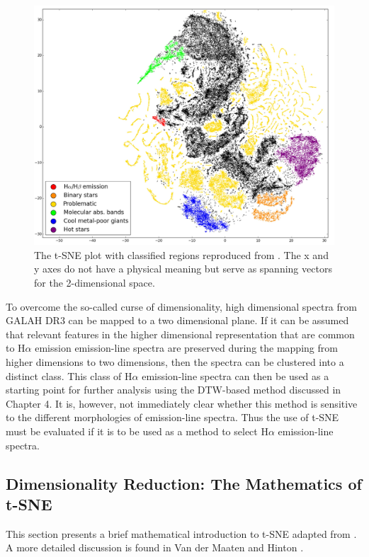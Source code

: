 \begin{figure}[!htb]
\centering
\includegraphics[scale=0.40]{figures/tsne traven.png}
\caption{The t-SNE plot with classified regions reproduced from \citet{traven2017galah}. The x and y axes do not have a physical meaning but serve as spanning vectors for the 2-dimensional space.}
\label{fig5.1}
\end{figure}

To overcome the so-called curse of dimensionality, high dimensional spectra from GALAH DR3 can be mapped to a two dimensional plane. If it can be assumed that relevant features in the higher dimensional representation that are common to H$\alpha$ emission emission-line spectra are preserved during the mapping from higher dimensions to two dimensions, then the spectra can be clustered into a distinct class. This class of H$\alpha$ emission-line spectra can then be used as a starting point for further analysis using the DTW-based method discussed in Chapter 4. It is, however, not immediately clear whether this method is sensitive to the different morphologies of emission-line spectra. Thus the use of t-SNE must be evaluated if it is to be used as a method to select H$\alpha$ emission-line spectra.

\subsection{Dimensionality Reduction: The Mathematics of t-SNE}

This section presents a brief mathematical introduction to t-SNE adapted from \citet{traven2017galah}. A more detailed discussion is found in Van der Maaten and Hinton \citep{van2008visualizing}. 

